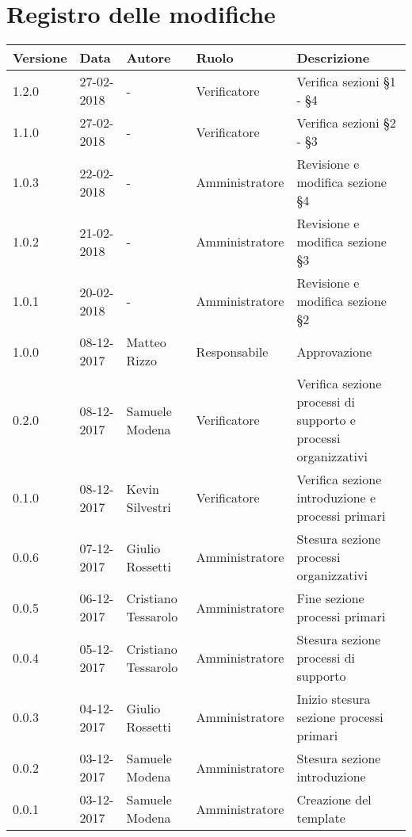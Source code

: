 \documentclass[./NormediProgetto.tex]{subfiles}
\begin{document}
\chapter*{Registro delle modifiche}
\setlength\LTleft{-22mm}
\begin{longtable}{|p{20mm}|p{20mm}|p{40mm}|p{30mm}|p{50mm}|}
	\hline
	\textbf{Versione} & \textbf{Data} & \textbf{Autore} & \textbf{Ruolo} & \textbf{Descrizione} \\ \hline 
		1.2.0 & 27-02-2018 & - & Verificatore & Verifica sezioni §1 - §4\\ \hline  
		1.1.0 & 27-02-2018 & - & Verificatore & Verifica sezioni §2 - §3\\ \hline 
		1.0.3 & 22-02-2018 & - & Amministratore & Revisione e modifica sezione §4\\ \hline 
		1.0.2 & 21-02-2018 & - & Amministratore & Revisione e modifica sezione §3\\ \hline 
		1.0.1 & 20-02-2018 & - & Amministratore & Revisione e modifica sezione §2\\ \hline 
		1.0.0 & 08-12-2017 & Matteo Rizzo & Responsabile & Approvazione\\ \hline
		0.2.0 & 08-12-2017 & Samuele Modena & Verificatore & Verifica sezione processi di supporto e processi organizzativi\\ \hline
		0.1.0 & 08-12-2017 & Kevin Silvestri & Verificatore & Verifica sezione introduzione e processi primari\\ \hline
		0.0.6 & 07-12-2017 & Giulio Rossetti & Amministratore & Stesura sezione processi organizzativi\\ \hline
		0.0.5 & 06-12-2017 & Cristiano Tessarolo & Amministratore & Fine sezione processi primari\\ \hline
		0.0.4 & 05-12-2017 & Cristiano Tessarolo & Amministratore & Stesura sezione processi di supporto\\ \hline
		0.0.3 & 04-12-2017 & Giulio Rossetti & Amministratore & Inizio stesura sezione processi primari\\ \hline
		0.0.2 & 03-12-2017 & Samuele Modena & Amministratore & Stesura sezione introduzione\\ \hline
		0.0.1 & 03-12-2017 & Samuele Modena & Amministratore & Creazione del template\\ \hline
\end{longtable}
\end{document}
